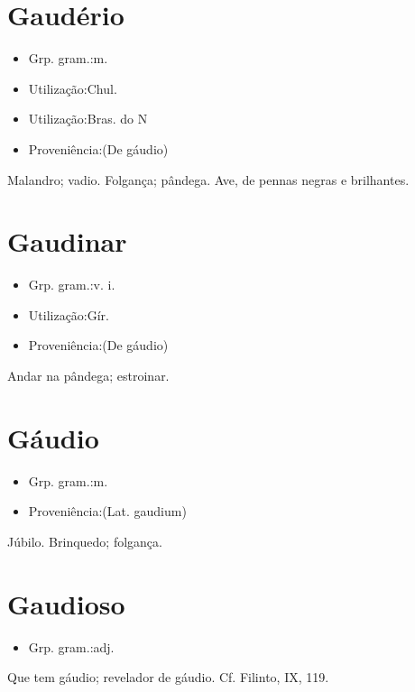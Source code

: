 \section{Gaudério}
\begin{itemize}
\item {Grp. gram.:m.}
\end{itemize}
\begin{itemize}
\item {Utilização:Chul.}
\end{itemize}
\begin{itemize}
\item {Utilização:Bras. do N}
\end{itemize}
\begin{itemize}
\item {Proveniência:(De \textunderscore gáudio\textunderscore )}
\end{itemize}
Malandro; vadio.
Folgança; pândega.
Ave, de pennas negras e brilhantes.
\section{Gaudinar}
\begin{itemize}
\item {Grp. gram.:v. i.}
\end{itemize}
\begin{itemize}
\item {Utilização:Gír.}
\end{itemize}
\begin{itemize}
\item {Proveniência:(De \textunderscore gáudio\textunderscore )}
\end{itemize}
Andar na pândega; estroinar.
\section{Gáudio}
\begin{itemize}
\item {Grp. gram.:m.}
\end{itemize}
\begin{itemize}
\item {Proveniência:(Lat. \textunderscore gaudium\textunderscore )}
\end{itemize}
Júbilo.
Brinquedo; folgança.
\section{Gaudioso}
\begin{itemize}
\item {Grp. gram.:adj.}
\end{itemize}
Que tem gáudio; revelador de gáudio. Cf. Filinto, IX, 119.
